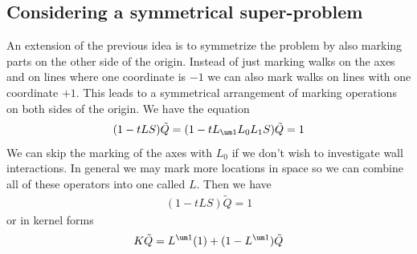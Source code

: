 \subsection{Considering a symmetrical super-problem}
An extension of the previous idea is to symmetrize the problem by also marking parts on the other side of the origin. Instead of just marking walks on the axes and on lines where one coordinate is $-1$ we can also mark walks on lines with one coordinate $+1$. This leads to a symmetrical arrangement of marking operations on both sides of the origin. We have the equation
\begin{align}
	(1- tLS)\tilde Q = (1- t L_{\um 1}L_0L_1 S)\tilde Q = 1
\end{align}
We can skip the marking of the axes with $L_0$ if we don't wish to investigate wall interactions. In general we may mark more locations in space so we can combine all of these operators into one called $L$. Then we have
\begin{align}
	(1- tLS)\tilde Q = 1
\end{align}
or in kernel forms
\begin{align}
	K\tilde Q = L^{\um 1}(1) + (1- L^{\um 1})\tilde Q
\end{align}

